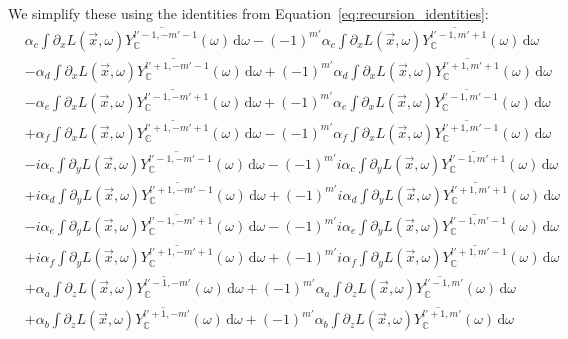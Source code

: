 \documentclass{egpubl}
\newcommand{\ud}{\,\mathrm{d}} %
\begin{document}
We simplify these using the identities from Equation~\ref{eq:recursion_identities}:
\begin{align*}
&
\alpha_c\int{\partial_xL\left (\vec{x} ,\omega \right )\overline{Y_{\mathbb{C}}^{l'-1, -m'-1}}(\omega )\ud\omega}
-\left({-1}\right)^{m'}\alpha_c\int{\partial_xL\left (\vec{x} ,\omega \right )\overline{Y_{\mathbb{C}}^{l'-1, m'+1}}(\omega )\ud\omega}
\\&
-\alpha_d\int{\partial_xL\left (\vec{x} ,\omega \right )\overline{Y_{\mathbb{C}}^{l'+1, -m'-1}}(\omega )\ud\omega}
+\left({-1}\right)^{m'}\alpha_d\int{\partial_xL\left (\vec{x} ,\omega \right )\overline{Y_{\mathbb{C}}^{l'+1, m'+1}}(\omega )\ud\omega}
\\&
-\alpha_e\int{\partial_xL\left (\vec{x} ,\omega \right )\overline{Y_{\mathbb{C}}^{l'-1, -m'+1}}(\omega )\ud\omega}
+\left({-1}\right)^{m'}\alpha_e\int{\partial_xL\left (\vec{x} ,\omega \right )\overline{Y_{\mathbb{C}}^{l'-1, m'-1}}(\omega )\ud\omega}
\\&
+\alpha_f\int{\partial_xL\left (\vec{x} ,\omega \right )\overline{Y_{\mathbb{C}}^{l'+1, -m'+1}}(\omega )\ud\omega}
-\left({-1}\right)^{m'}\alpha_f\int{\partial_xL\left (\vec{x} ,\omega \right )\overline{Y_{\mathbb{C}}^{l'+1, m'-1}}(\omega )\ud\omega}
\\&
-i \alpha_c\int{\partial_yL\left (\vec{x} ,\omega \right )\overline{Y_{\mathbb{C}}^{l'-1, -m'-1}}(\omega )\ud\omega}
-\left({-1}\right)^{m'}i \alpha_c\int{\partial_yL\left (\vec{x} ,\omega \right )\overline{Y_{\mathbb{C}}^{l'-1, m'+1}}(\omega )\ud\omega}
\\&
+i \alpha_d\int{\partial_yL\left (\vec{x} ,\omega \right )\overline{Y_{\mathbb{C}}^{l'+1, -m'-1}}(\omega )\ud\omega}
+\left({-1}\right)^{m'}i \alpha_d\int{\partial_yL\left (\vec{x} ,\omega \right )\overline{Y_{\mathbb{C}}^{l'+1, m'+1}}(\omega )\ud\omega}
\\&
-i \alpha_e\int{\partial_yL\left (\vec{x} ,\omega \right )\overline{Y_{\mathbb{C}}^{l'-1, -m'+1}}(\omega )\ud\omega}
-\left({-1}\right)^{m'}i \alpha_e\int{\partial_yL\left (\vec{x} ,\omega \right )\overline{Y_{\mathbb{C}}^{l'-1, m'-1}}(\omega )\ud\omega}
\\&
+i \alpha_f\int{\partial_yL\left (\vec{x} ,\omega \right )\overline{Y_{\mathbb{C}}^{l'+1, -m'+1}}(\omega )\ud\omega}
+\left({-1}\right)^{m'}i \alpha_f\int{\partial_yL\left (\vec{x} ,\omega \right )\overline{Y_{\mathbb{C}}^{l'+1, m'-1}}(\omega )\ud\omega}
\\&
+\alpha_a\int{\partial_zL\left (\vec{x} ,\omega \right )\overline{Y_{\mathbb{C}}^{l'-1, -m'}}(\omega )\ud\omega}
+\left({-1}\right)^{m'}\alpha_a\int{\partial_zL\left (\vec{x} ,\omega \right )\overline{Y_{\mathbb{C}}^{l'-1, m'}}(\omega )\ud\omega}
\\&
+\alpha_b\int{\partial_zL\left (\vec{x} ,\omega \right )\overline{Y_{\mathbb{C}}^{l'+1, -m'}}(\omega )\ud\omega}
+\left({-1}\right)^{m'}\alpha_b\int{\partial_zL\left (\vec{x} ,\omega \right )\overline{Y_{\mathbb{C}}^{l'+1, m'}}(\omega )\ud\omega}
\end{align*}
\end{document}
